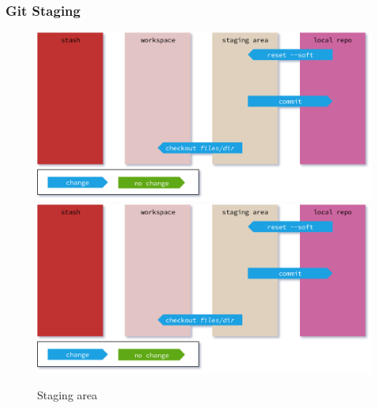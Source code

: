 \begin{frame}
    \frametitle{Git Staging}
    \addtocounter{page}{-1}
    \begin{figure}
        \begin{center}
            {
                \includegraphics[width=1\textwidth,keepaspectratio]{./images/GitAreas-Staging.png}
            }
            {
                \includegraphics[height=0.75\textheight,keepaspectratio]{./images/GitAreas-Staging.png}
            }
            \caption{Staging area}
        \end{center}
    \end{figure}
\end{frame}

